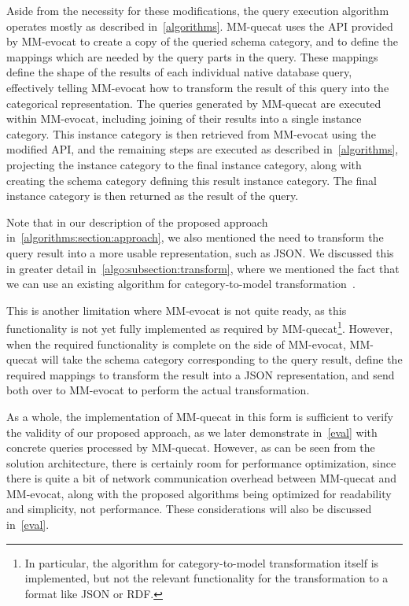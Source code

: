 Aside from the necessity for these modifications, the query execution algo\-rithm operates mostly as described in~\cref{algorithms}.
MM-quecat uses the API provided by MM-evocat to create a copy of the queried schema category, and to define the mappings which are needed by the query parts in the query.
These mappings define the shape of the results of each individual native database query, effectively telling MM-evocat how to transform the result of this query into the categorical representation.
The queries generated by MM-quecat are executed within MM-evocat, including joining of their results into a single instance category.
This instance category is then retrieved from MM-evocat using the modified API, and the remaining steps are executed as described in~\cref{algorithms}, projecting the instance category to the final instance category, along with creating the schema category defining this result instance category.
The final instance category is then returned as the result of the query.

Note that in our description of the proposed approach in~\cref{algorithms:section:approach}, we also mentioned the need to transform the query result into a more usable representation, such as JSON.
We discussed this in greater detail in~\cref{algo:subsection:transform}, where we mentioned the fact that we can use an existing algorithm for category-to-model transformation~\cite{unified_representation}.

This is another limitation where MM-evocat is not quite ready, as this functionality is not yet fully implemented as required by MM-quecat\footnote{In particular, the algorithm for category-to-model transformation itself is implemented, but not the relevant functionality for the transformation to a format like JSON or RDF.}.
However, when the required functionality is complete on the side of MM-evocat, MM-quecat will take the schema category corresponding to the query result, define the required mappings to transform the result into a JSON representation, and send both over to MM-evocat to perform the actual transformation.

As a whole, the implementation of MM-quecat in this form is sufficient to verify the validity of our proposed approach, as we later demonstrate in~\cref{eval} with concrete queries processed by MM-quecat.
However, as can be seen from the solution architecture, there is certainly room for performance optimization, since there is quite a bit of network communication overhead between MM-quecat and MM-evocat, along with the proposed algorithms being optimized for readability and simplicity, not performance.
These considerations will also be discussed in~\cref{eval}.
